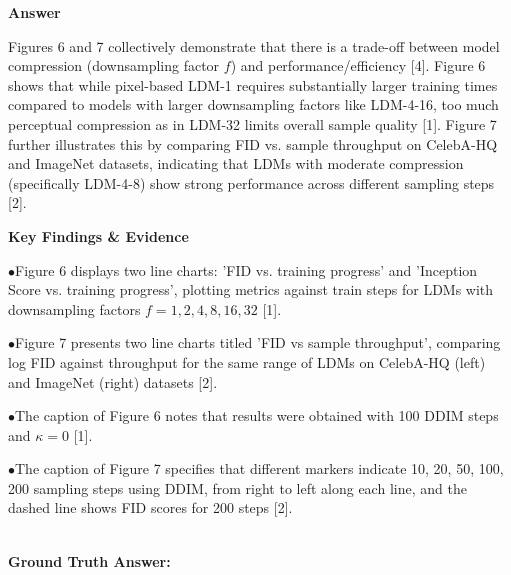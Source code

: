 \documentclass[10pt,a4paper]{article}
\begin{document}
\begin{tcolorbox}[questionbox]
{\small \noindent \textbf{Answer}\par\vspace{3pt}Figures 6 and 7 collectively demonstrate that there is a trade-off between model compression (downsampling factor $f$) and performance/efficiency [4]. Figure 6 shows that while pixel-based LDM-1 requires substantially larger training times compared to models with larger downsampling factors like LDM-{4-16}, too much perceptual compression as in LDM-32 limits overall sample quality [1]. Figure 7 further illustrates this by comparing FID vs. sample throughput on CelebA-HQ and ImageNet datasets, indicating that LDMs with moderate compression (specifically LDM-{4-8}) show strong performance across different sampling steps [2].\par\vspace{3pt}\noindent \textbf{Key Findings \& Evidence}\par\vspace{3pt}\noindent\hspace*{8pt}$\bullet$\hspace*{4pt}Figure 6 displays two line charts: 'FID vs. training progress' and 'Inception Score vs. training progress', plotting metrics against train steps for LDMs with downsampling factors $f=1,2,4,8,16,32$ [1].\par\vspace{3pt}\noindent\hspace*{8pt}$\bullet$\hspace*{4pt}Figure 7 presents two line charts titled 'FID vs sample throughput', comparing log FID against throughput for the same range of LDMs on CelebA-HQ (left) and ImageNet (right) datasets [2].\par\vspace{3pt}\noindent\hspace*{8pt}$\bullet$\hspace*{4pt}The caption of Figure 6 notes that results were obtained with 100 DDIM steps and $\kappa = 0$ [1].\par\vspace{3pt}\noindent\hspace*{8pt}$\bullet$\hspace*{4pt}The caption of Figure 7 specifies that different markers indicate {10, 20, 50, 100, 200} sampling steps using DDIM, from right to left along each line, and the dashed line shows FID scores for 200 steps [2].}\\[6pt]
{\noindent\bfseries\color{darkteal} Ground Truth Answer:}\\[2pt]

\end{tcolorbox}
\end{document}
